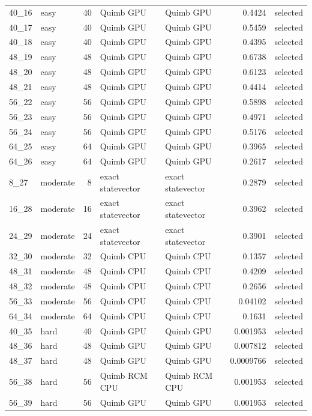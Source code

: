 \begin{longtable}{l l r l l r l}
40\_16 & easy & 40 & Quimb GPU & Quimb GPU & 0.4424 & selected \\
40\_17 & easy & 40 & Quimb GPU & Quimb GPU & 0.5459 & selected \\
40\_18 & easy & 40 & Quimb GPU & Quimb GPU & 0.4395 & selected \\
48\_19 & easy & 48 & Quimb GPU & Quimb GPU & 0.6738 & selected \\
48\_20 & easy & 48 & Quimb GPU & Quimb GPU & 0.6123 & selected \\
48\_21 & easy & 48 & Quimb GPU & Quimb GPU & 0.4414 & selected \\
56\_22 & easy & 56 & Quimb GPU & Quimb GPU & 0.5898 & selected \\
56\_23 & easy & 56 & Quimb GPU & Quimb GPU & 0.4971 & selected \\
56\_24 & easy & 56 & Quimb GPU & Quimb GPU & 0.5176 & selected \\
64\_25 & easy & 64 & Quimb GPU & Quimb GPU & 0.3965 & selected \\
64\_26 & easy & 64 & Quimb GPU & Quimb GPU & 0.2617 & selected \\
8\_27 & moderate & 8 & exact statevector & exact statevector & 0.2879 & selected \\
16\_28 & moderate & 16 & exact statevector & exact statevector & 0.3962 & selected \\
24\_29 & moderate & 24 & exact statevector & exact statevector & 0.3901 & selected \\
32\_30 & moderate & 32 & Quimb CPU & Quimb CPU & 0.1357 & selected \\
48\_31 & moderate & 48 & Quimb CPU & Quimb CPU & 0.4209 & selected \\
48\_32 & moderate & 48 & Quimb CPU & Quimb CPU & 0.2656 & selected \\
56\_33 & moderate & 56 & Quimb CPU & Quimb CPU & 0.04102 & selected \\
64\_34 & moderate & 64 & Quimb CPU & Quimb CPU & 0.1631 & selected \\
40\_35 & hard & 40 & Quimb GPU & Quimb GPU & 0.001953 & selected \\
48\_36 & hard & 48 & Quimb GPU & Quimb GPU & 0.007812 & selected \\
48\_37 & hard & 48 & Quimb GPU & Quimb GPU & 0.0009766 & selected \\
56\_38 & hard & 56 & Quimb RCM CPU & Quimb RCM CPU & 0.001953 & selected \\
56\_39 & hard & 56 & Quimb GPU & Quimb GPU & 0.001953 & selected \\

\end{longtable}

